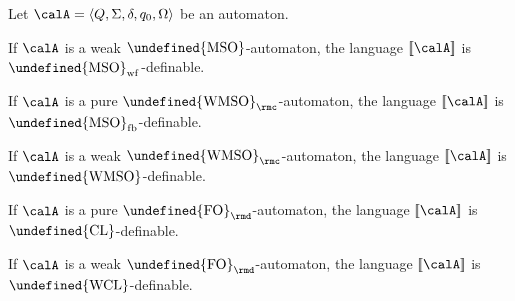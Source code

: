 \documentclass[10pt, fleqn]{scrartcl}
\makeatletter
\newcommand\m@thsm@ller[2]{\mbox{\relscale{0.91}$\m@th#1#2$}}
\let\smaller\undefined
\DeclareRobustCommand\smaller[1]{\relax\ifmmode{\mathpalette\m@thsm@ller{#1}}\else{\relscale{0.91}#1}\fi}
\newcommand*{\WMSO}{\smaller{\mathrm{WMSO}}}
\newcommand*{\MSO}{\smaller{\mathrm{MSO}}}
\newcommand*{\CL}{\smaller{\mathrm{CL}}}
\newcommand*{\WCL}{\smaller{\mathrm{WCL}}}
\newcommand*{\FO}{\smaller{\mathrm{FO}}}
\newcommand*{\?}{\kern .08em}
\newcommand\lsem{[\![}
\newcommand\rsem{]\!]}
\makeatother
\begin{document}
\begin{Lem}\label{Lem: MSO automata MSO-definable}
Let $\calA = \langle Q,\Sigma,\delta,q_0,\Omega\rangle$ be an automaton.
\begin{enuma}
\item If $\calA$ is a weak $\MSO$-automaton, the language $\lsem\calA\rsem$ is
  $\MSO_{\mathrm{wf}}$-definable.
\item If $\calA$ is a pure $\WMSO_\rmc$-automaton, the language $\lsem\calA\rsem$ is
  $\MSO_{\mathrm{fb}}$-definable.
\item If $\calA$ is a weak $\WMSO_\rmc$-automaton, the language $\lsem\calA\rsem$ is
  $\WMSO$-definable.
\item If $\calA$ is a pure $\FO_\rmd$-automaton, the language $\lsem\calA\rsem$ is
  $\CL$-definable.
\item If $\calA$ is a weak $\FO_\rmd$-automaton, the language $\lsem\calA\rsem$ is
  $\WCL$-definable.
\end{enuma}
\end{Lem}
\end{document}
